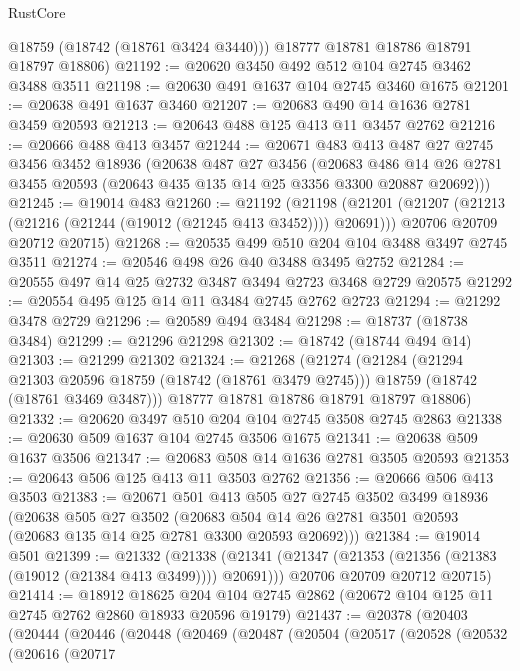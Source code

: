 \begin{lexlean}{RustCore}
\begin{coremodule}
        @18759
        (@18742 (@18761 @3424 @3440)))
      @18777
      @18781
      @18786
      @18791
      @18797
      @18806)
@21192 := @20620 @3450 @492 @512 @104 @2745 @3462 @3488 @3511
@21198 := @20630 @491 @1637 @104 @2745 @3460 @1675
@21201 := @20638 @491 @1637 @3460
@21207 := @20683 @490 @14 @1636 @2781 @3459 @20593
@21213 := @20643 @488 @125 @413 @11 @3457 @2762
@21216 := @20666 @488 @413 @3457
@21244 := @20671
    @483
    @413
    @487
    @27
    @2745
    @3456
    @3452
    @18936
    (@20638
      @487
      @27
      @3456
      (@20683 @486 @14 @26 @2781 @3455 @20593 (@20643 @435 @135 @14 @25 @3356 @3300 @20887 @20692)))
@21245 := @19014 @483
@21260 := @21192
    (@21198
      (@21201 (@21207 (@21213 (@21216 (@21244 (@19012 (@21245 @413 @3452)))) @20691)))
      @20706
      @20709
      @20712
      @20715)
@21268 := @20535 @499 @510 @204 @104 @3488 @3497 @2745 @3511
@21274 := @20546 @498 @26 @40 @3488 @3495 @2752
@21284 := @20555 @497 @14 @25 @2732 @3487 @3494 @2723 @3468 @2729 @20575
@21292 := @20554 @495 @125 @14 @11 @3484 @2745 @2762 @2723
@21294 := @21292 @3478 @2729
@21296 := @20589 @494 @3484
@21298 := @18737 (@18738 @3484)
@21299 := @21296 @21298
@21302 := @18742 (@18744 @494 @14)
@21303 := @21299 @21302
@21324 := @21268
    (@21274
      (@21284
        (@21294 @21303 @20596 @18759 (@18742 (@18761 @3479 @2745)))
        @18759
        (@18742 (@18761 @3469 @3487)))
      @18777
      @18781
      @18786
      @18791
      @18797
      @18806)
@21332 := @20620 @3497 @510 @204 @104 @2745 @3508 @2745 @2863
@21338 := @20630 @509 @1637 @104 @2745 @3506 @1675
@21341 := @20638 @509 @1637 @3506
@21347 := @20683 @508 @14 @1636 @2781 @3505 @20593
@21353 := @20643 @506 @125 @413 @11 @3503 @2762
@21356 := @20666 @506 @413 @3503
@21383 := @20671
    @501
    @413
    @505
    @27
    @2745
    @3502
    @3499
    @18936
    (@20638
      @505
      @27
      @3502
      (@20683 @504 @14 @26 @2781 @3501 @20593 (@20683 @135 @14 @25 @2781 @3300 @20593 @20692)))
@21384 := @19014 @501
@21399 := @21332
    (@21338
      (@21341 (@21347 (@21353 (@21356 (@21383 (@19012 (@21384 @413 @3499)))) @20691)))
      @20706
      @20709
      @20712
      @20715)
@21414 := @18912
    @18625
    @204
    @104
    @2745
    @2862
    (@20672 @104 @125 @11 @2745 @2762 @2860 @18933 @20596 @19179)
@21437 := @20378
    (@20403
      (@20444
        (@20446
          (@20448
            (@20469
              (@20487
                (@20504
                  (@20517
                    (@20528
                      (@20532
                        (@20616
                          (@20717

\end{coremodule}
\end{lexlean}
